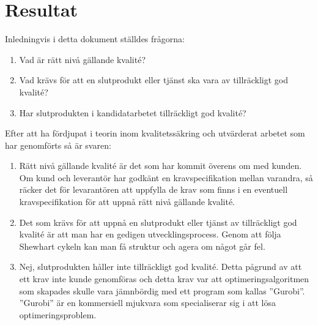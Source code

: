 \section{Resultat}
Inledningvis i detta dokument ställdes frågorna:

\begin{enumerate}
  \item Vad är rätt nivå gällande kvalité?
  \item Vad krävs för att en slutprodukt eller tjänst ska vara av tillräckligt god kvalité?
  \item Har slutprodukten i kandidatarbetet tillräckligt god kvalité?
\end{enumerate}

\noindent Efter att ha fördjupat i teorin inom kvalitetssäkring och utvärderat arbetet som har genomförts så är svaren:

\begin{enumerate}
  \item Rätt nivå gällande kvalité är det som har kommit överens om med kunden. Om kund och leverantör har godkänt en kravspecifikation mellan varandra, så räcker det för levarantören att uppfylla de krav som finns i en eventuell kravspecifikation för att uppnå rätt nivå gällande kvalité.
  \item Det som krävs för att uppnå en slutprodukt eller tjänst av tillräckligt god kvalité är att man har en gedigen utvecklingsprocess. Genom att följa Shewhart cykeln kan man få struktur och agera om något går fel.
  \item Nej, slutprodukten håller inte tillräckligt god kvalité. Detta pågrund av att ett krav inte kunde genomföras och detta krav var att optimeringsalgoritmen som skapades skulle vara jämnbördig med ett program som kallas ''Gurobi''. ''Gurobi'' är en kommersiell mjukvara som specialiserar sig i att lösa optimeringsproblem.
\end{enumerate}